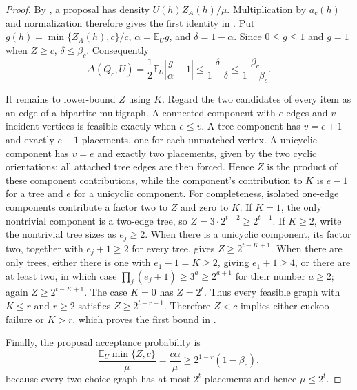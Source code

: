 \begin{proof}
By , a proposal has density
$U(h)Z_A(h)/\mu$.  Multiplication by $a_c(h)$ and normalization therefore
gives the first identity in
.  Put
$g(h)=\min\{Z_A(h),c\}/c$, $\alpha=\mathbb E_Ug$, and
$\delta=1-\alpha$.  Since $0\leq g\leq1$ and $g=1$ when $Z\geq c$,
$\delta\leq\beta_c$.  Consequently
\[
 \Delta(Q_c,U)
 =\frac12\mathbb E_U\left|\frac{g}{\alpha}-1\right|
 \leq\frac{\delta}{1-\delta}
 \leq\frac{\beta_c}{1-\beta_c}.
\]

It remains to lower-bound $Z$ using $K$.  Regard the two candidates of every
item as an edge of a bipartite multigraph.  A connected component with $e$
edges and $v$ incident vertices is feasible exactly when $e\leq v$.  A tree
component has $v=e+1$ and exactly $e+1$ placements, one for each unmatched
vertex.  A unicyclic component has $v=e$ and exactly two placements, given by
the two cyclic orientations; all attached tree edges are then forced.  Hence
$Z$ is the product of these component contributions, while the component's
contribution to $K$ is $e-1$ for a tree and $e$ for a unicyclic component.
For completeness, isolated one-edge components contribute a factor two to
$Z$ and zero to $K$.  If $K=1$, the only nontrivial component is a two-edge
tree, so $Z=3\cdot2^{t-2}\geq2^{t-1}$.  If $K\geq2$, write the nontrivial tree
sizes as $e_j\geq2$.  When there is a unicyclic component, its factor two,
together with $e_j+1\geq2$ for every tree, gives
$Z\geq2^{t-K+1}$.  When there are only trees, either there is one with
$e_1-1=K\geq2$, giving $e_1+1\geq4$, or there are at least two, in which case
$\prod_j(e_j+1)\geq3^a\geq2^{a+1}$ for their number $a\geq2$; again
$Z\geq2^{t-K+1}$.  The case $K=0$ has $Z=2^t$.  Thus every feasible graph
with $K\leq r$ and $r\geq2$ satisfies $Z\geq2^{t-r+1}$.  Therefore $Z<c$
implies either cuckoo failure or $K>r$,
which proves the first bound in
.

Finally, the proposal acceptance probability is
\[
 \frac{\mathbb E_U\min\{Z,c\}}{\mu}
 =\frac{c\alpha}{\mu}
 \geq 2^{1-r}(1-\beta_c),
\]
because every two-choice graph has at most $2^t$ placements and hence
$\mu\leq2^t$.
\end{proof}


